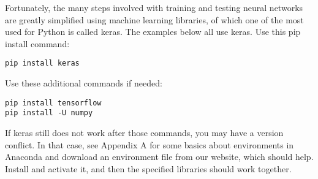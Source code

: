 Fortunately, the many steps involved with training and testing neural networks are greatly simplified using machine learning libraries, of which one of the most used for Python is called keras. The examples below all use keras. Use this pip install command:
\begin{lstlisting}
pip install keras
\end{lstlisting}
Use these additional commands if needed:
\begin{lstlisting}
pip install tensorflow
pip install -U numpy
\end{lstlisting}
If keras still does not work after those commands, you may have a version conflict. In that case, see Appendix A for some basics about environments in Anaconda and download an environment file from our website, which should help. Install and activate it, and then the specified libraries should work together.

